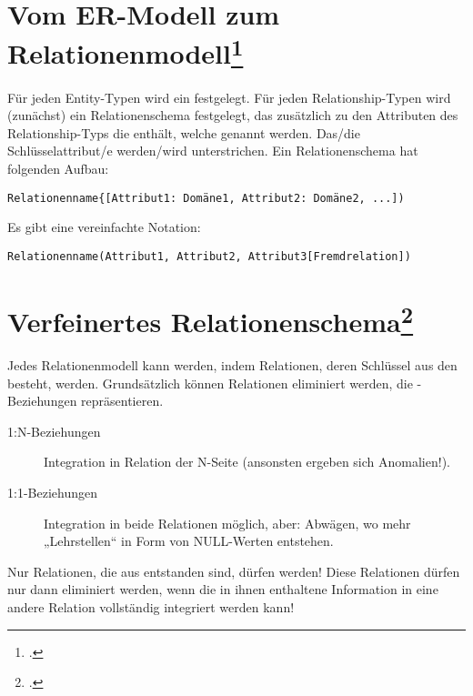 \documentclass{lehramt-informatik-haupt}
\begin{document}
\section{Vom ER-Modell zum Relationenmodell\footcite[Seite 33]{db:fs:1}}

Für jeden Entity-Typen wird ein  festgelegt.
%
Für jeden Relation\-ship-Typen wird (zunächst) ein Relationenschema
festgelegt, das zusätzlich zu den Attributen des Relationship-Typs die
 enthält, welche
 genannt werden. Das/die Schlüsselattribut/e
werden/wird unterstrichen.
%
Ein Relationenschema hat folgenden Aufbau:

\begin{center}
\texttt{Relationenname\{[Attribut1: Domäne1, Attribut2: Domäne2, ...])}
\end{center}

\noindent
Es gibt eine vereinfachte Notation:

\begin{center}
\texttt{Relationenname(Attribut1, Attribut2, Attribut3[Fremdrelation])}
\end{center}

%

\section{Verfeinertes Relationenschema\footcite[Seite 34]{db:fs:1}}

Jedes Relationenmodell kann  werden, indem Relationen,
deren Schlüssel aus den  besteht,
 werden.
Grundsätzlich können  Relationen eliminiert werden,
die -Beziehungen repräsentieren.

\begin{description}
\item[1:N-Beziehungen] Integration in Relation der N-Seite (ansonsten
ergeben sich Anomalien!).

\item[1:1-Beziehungen] Integration in beide Relationen möglich, aber:
Abwägen, wo mehr „Lehrstellen“ in Form von NULL-Werten entstehen.
\end{description}

\noindent
Nur Relationen, die aus  entstanden sind,
dürfen  werden! Diese Relationen dürfen nur dann
eliminiert werden, wenn die in ihnen enthaltene Information in eine
andere Relation vollständig integriert werden kann!
\end{document}

